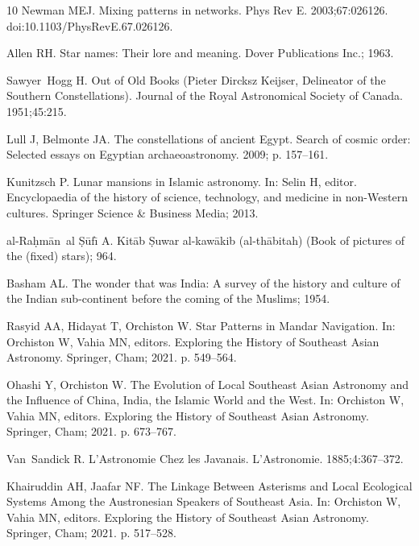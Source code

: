 \documentclass[10pt]{article}
\begin{document}
{\begin{thebibliography}{10}
Newman MEJ.
\newblock Mixing patterns in networks.
\newblock Phys Rev E. 2003;67:026126.
\newblock doi:{10.1103/PhysRevE.67.026126}.

Allen RH.
\newblock Star names: Their lore and meaning.
\newblock Dover Publications Inc.; 1963.

Sawyer~Hogg H.
\newblock Out of Old Books ({Pieter Dircksz Keijser}, Delineator of the
  {Southern} Constellations).
\newblock Journal of the Royal Astronomical Society of Canada. 1951;45:215.

Lull J, Belmonte JA.
\newblock The constellations of ancient {E}gypt.
\newblock Search of cosmic order: Selected essays on Egyptian archaeoastronomy.
  2009; p. 157--161.

Kunitzsch P.
\newblock Lunar mansions in {Islamic} astronomy.
\newblock In: Selin H, editor. Encyclopaedia of the history of science,
  technology, and medicine in non-{W}estern cultures. Springer Science \&
  Business Media; 2013.

al-Ra\d{h}m\={a}n~al \d{S}\={u}f\={\i} A.
\newblock Kit\={a}b \d{S}uwar al-kaw\={a}kib (al-th\={a}bitah) ({B}ook of
  pictures of the (fixed) stars); 964.

Basham AL.
\newblock The wonder that was India: A survey of the history and culture of the
  Indian sub-continent before the coming of the Muslims; 1954.

Rasyid AA, Hidayat T, Orchiston W.
\newblock Star Patterns in {Mandar} Navigation.
\newblock In: Orchiston W, Vahia MN, editors. Exploring the History of
  Southeast Asian Astronomy. Springer, Cham; 2021. p. 549--564.

Ohashi Y, Orchiston W.
\newblock The Evolution of Local {Southeast Asian} Astronomy and the Influence
  of {China, India, the Islamic World and the West}.
\newblock In: Orchiston W, Vahia MN, editors. Exploring the History of
  Southeast Asian Astronomy. Springer, Cham; 2021. p. 673--767.

Van~Sandick R.
\newblock L'Astronomie Chez les {Javanais}.
\newblock L'Astronomie. 1885;4:367--372.

Khairuddin AH, Jaafar NF.
\newblock The Linkage Between Asterisms and Local Ecological Systems Among the
  {Austronesian} Speakers of {Southeast Asia}.
\newblock In: Orchiston W, Vahia MN, editors. Exploring the History of
  Southeast Asian Astronomy. Springer, Cham; 2021. p. 517--528.


\end{thebibliography}}
\end{document}

